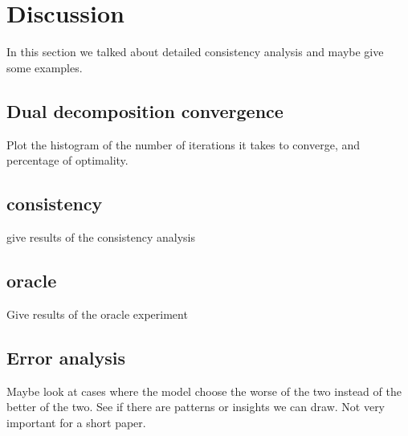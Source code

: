 \section{Discussion}

In this section we talked about detailed consistency analysis and maybe give some examples.
\subsection{Dual decomposition convergence}
Plot the histogram of the number of iterations it takes to converge, and percentage of optimality. 

\subsection{consistency}

give results of the consistency analysis

\subsection{oracle}

Give results of the oracle experiment

\subsection{Error analysis}
Maybe look at cases where the model choose the worse of the two instead of the better of the two. See if there are patterns or insights we can draw. Not very important for a short paper.